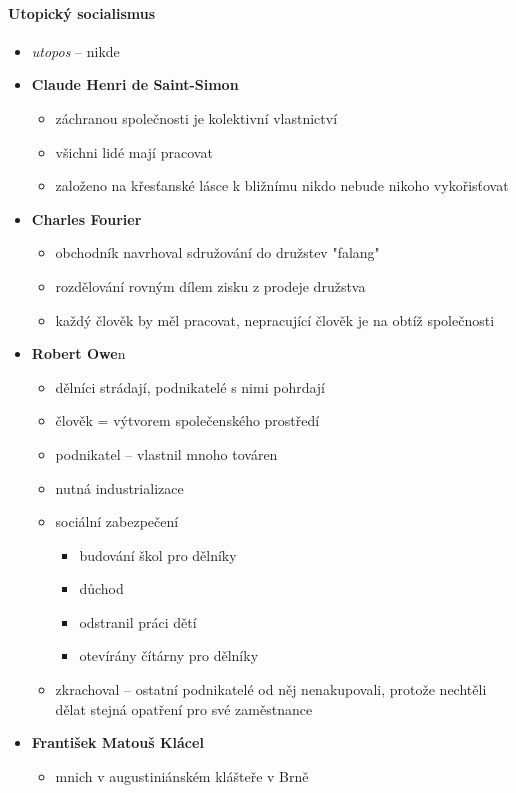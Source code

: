 \paragraph{Utopický socialismus}
\begin{itemize}
\item \textit{utopos} -- nikde
\item \textbf{Claude Henri de Saint-Simon}
	\begin{itemize}
	\item záchranou společnosti je kolektivní vlastnictví
	\item všichni lidé mají pracovat
	\item založeno na křesťanské lásce k bližnímu \ra nikdo nebude nikoho vykořisťovat
	\end{itemize}
\item \textbf{Charles Fourier}
	\begin{itemize}
	\item obchodník \ra navrhoval sdružování do družstev "falang"
	\item rozdělování rovným dílem zisku z prodeje družstva
	\item každý člověk by měl pracovat, nepracující člověk je na obtíž společnosti
	\end{itemize}
\item \textbf{Robert Owe}n 
	\begin{itemize}
	\item dělníci strádají, podnikatelé s nimi pohrdají
	\item člověk = výtvorem společenského prostředí
	\item podnikatel -- vlastnil mnoho továren
	\item nutná industrializace
	\item sociální zabezpečení 
		\begin{itemize}
		\item budování škol pro dělníky
		\item důchod
		\item odstranil práci dětí
		\item otevírány čítárny pro dělníky
		\end{itemize}
	\item zkrachoval -- ostatní podnikatelé od něj nenakupovali, protože nechtěli dělat stejná opatření pro své zaměstnance
	\end{itemize}
\item \textbf{František Matouš Klácel}
	\begin{itemize}
	\item mnich v augustiniánském klášteře v Brně

\end{itemize}
\end{itemize}

